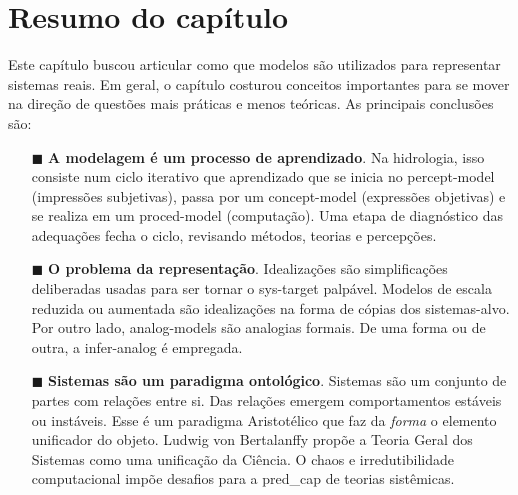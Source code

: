 \documentclass[./main.tex]{subfiles}
\begin{document}
\clearpage

\section{Resumo do capítulo} \label{sec:sys:summary}

\par Este capítulo buscou articular como que modelos são utilizados para representar sistemas reais. Em geral, o capítulo costurou conceitos importantes para se mover na direção de questões mais práticas e menos teóricas. As principais conclusões são:

\begin{itemize}
    \item[$\blacksquare$] \textbf{A modelagem é um processo de aprendizado}. Na hidrologia, isso consiste num ciclo iterativo que aprendizado que se inicia no \gls{percept-model} (impressões subjetivas), passa por um \gls{concept-model} (expressões objetivas) e se realiza em um \gls{proced-model} (computação). Uma etapa de diagnóstico das adequações fecha o ciclo, revisando métodos, teorias e percepções.    
    \item[$\blacksquare$] \textbf{O problema da representação}. Idealizações são simplificações deliberadas usadas para ser tornar o \gls{sys-target} palpável. Modelos de escala reduzida ou aumentada são idealizações na forma de cópias dos sistemas-alvo. Por outro lado, \gls{analog-models} são analogias formais. De uma forma ou de outra, a \gls{infer-analog} é empregada.
    
    \item[$\blacksquare$] \textbf{Sistemas são um \gls{paradigma} ontológico}. Sistemas são um conjunto de partes com relações entre si. Das relações emergem comportamentos estáveis ou instáveis. Esse é um \gls{paradigma} Aristotélico que faz da \textit{forma} o elemento unificador do objeto. Ludwig von Bertalanffy propõe a Teoria Geral dos Sistemas como uma unificação da Ciência. O \gls{chaos} e irredutibilidade computacional impõe desafios para a \gls{pred_cap} de teorias sistêmicas.
    

\end{itemize}
\end{document}
